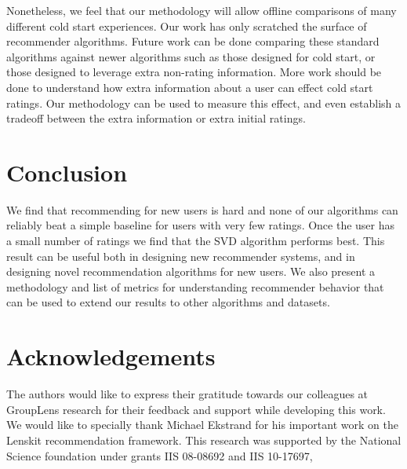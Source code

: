 \documentclass[letterpaper]{sig-alternate}
\begin{document}
  Nonetheless, we feel that our methodology will allow offline comparisons of many different cold start experiences.
  Our work has only scratched the surface of recommender algorithms.
  Future work can be done comparing these standard algorithms against newer algorithms such as those designed for cold start, or those designed to leverage extra non-rating information.
  More work should be done to understand how extra information about a user can effect cold start ratings.
  Our methodology can be used to measure this effect, and even establish a tradeoff between the extra information or extra initial ratings.



\section{Conclusion}
  We find that recommending for new users is hard and none of our algorithms can reliably beat a simple baseline for users with very few ratings.
  Once the user has a small number of ratings we find that the SVD algorithm performs best.
  This result can be useful both in designing new recommender systems, and in designing novel recommendation algorithms for new users.
  We also present a methodology and list of metrics for understanding recommender behavior that can be used to extend our results to other algorithms and datasets.

\section{Acknowledgements}
  
  The authors would like to express their gratitude towards our colleagues at GroupLens research for their feedback and support while developing this work.
  We would like to specially thank Michael Ekstrand for his  important work on the Lenskit recommendation framework.
This research was supported by the National Science foundation under grants IIS 08-08692 and IIS 10-17697,



\end{document}
